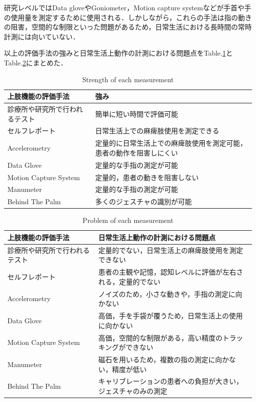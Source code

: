 研究レベルではData gloveやGoniometer，Motion capture system\cite{Binh2014,Valtin2017,Chen2003,Ren2011}などが手首や手の使用量を測定するために使用される．しかしながら，これらの手法は指の動きの阻害，空間的な制限といった問題があるため，日常生活における長時間の常時計測には向いていない．

以上の評価手法の強みと日常生活上動作の計測における問題点をTable.\ref{table:strength}とTable.\ref{table:weakness}にまとめた．
\begin{table}[H]
  \caption{Strength of each measurement}
  \label{table:strength}
  \centering
  \begin{tabular}{ll}
    \hline
    上肢機能の評価手法 & 強み\\
    \hline \hline 
    診療所や研究所で行われるテスト  & 簡単に短い時間で評価可能  \\
    セルフレポート & 日常生活上での麻痺肢使用を測定できる \\
    Accelerometry  & 定量的に日常生活上での麻痺肢使用を測定可能，患者の動作を阻害しにくい \\
    Data Glove  & 定量的な手指の測定が可能  \\
    Motion Capture System  & 定量的，患者の動きを阻害しない  \\
    Manumeter  & 定量的な手指の測定が可能 \\
    Behind The Palm  & 多くのジェスチャの識別が可能 \\ 
    \hline
  \end{tabular}
\end{table}

\begin{table}[H]
  \caption{Problem of each measurement}
  \label{table:weakness}
  \centering
  \begin{tabular}{ll}
    \hline
    上肢機能の評価手法 & 日常生活上動作の計測における問題点 \\
    \hline \hline 
    診療所や研究所で行われるテスト   & 定量的でない，日常生活上の麻痺肢使用を測定できない \\
    セルフレポート & 患者の主観や記憶，認知レベルに評価が左右される，定量的でない\\
    Accelerometry   & ノイズのため，小さな動きや，手指の測定に向かない \\
    Data Glove  &  高価，手を手袋が覆うため，日常生活上の使用に向かない \\
    Motion Capture System   & 高価，空間的な制限がある，高い精度のトラッキングができない \\
    Manumeter  & 磁石を用いるため，複数の指の測定に向かない，精度が低い\\
    Behind The Palm   & キャリブレーションの患者への負担が大きい，ジェスチャのみの測定\\ 
    \hline
  \end{tabular}
\end{table}

